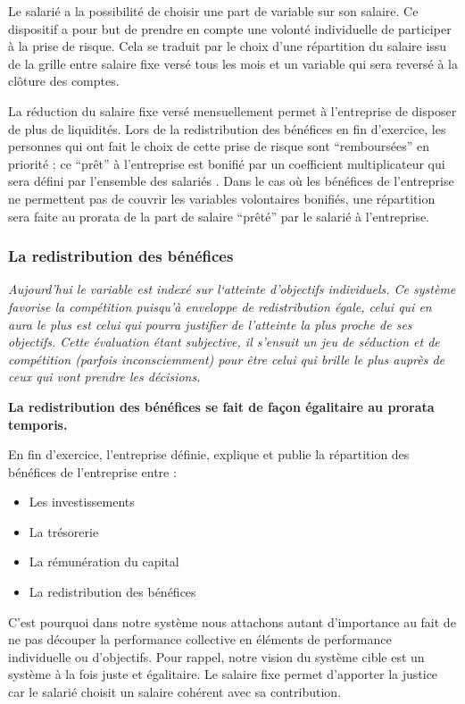 \documentclass[12pt]{article}
\newcommand{\assemblee}[1]{%
  \begin{tcolorbox}[colframe=DarkPlum,boxrule=2pt,arc=4pt,left=6pt,right=6pt,top=6pt,bottom=6pt,boxsep=0pt,colback=white]
    \begin{tabular}{m{1cm} m{0.86\textwidth}}
      {\huge \faUsers} & #1 \\
    \end{tabular}
  \end{tcolorbox}
}
\newcommand{\actuel}[1]{%
  \begin{tcolorbox}[colframe=DarkButter,boxrule=2pt,arc=4pt,left=6pt,right=6pt,top=6pt,bottom=6pt,boxsep=0pt,colback=Aluminium2]
    \textit{#1}
  \end{tcolorbox}
}
\newcommand{\regle}[1]{%
  \begin{tcolorbox}[colframe=DarkOrange,boxrule=2pt,arc=4pt,left=6pt,right=6pt,top=6pt,bottom=6pt,boxsep=0pt,colback=LightOrange]
  \textbf{#1}
  \end{tcolorbox}
}
\begin{document}
 Le salarié a la possibilité de choisir une part de variable sur son salaire. Ce dispositif a pour but de prendre en compte une volonté individuelle de participer à la prise de risque. Cela se traduit par le choix d’une répartition du salaire issu de la grille entre salaire fixe versé tous les mois et un variable qui sera reversé à la clôture des comptes. 
 
 La réduction du salaire fixe versé mensuellement permet à l’entreprise de disposer de plus de liquidités. Lors de la redistribution des bénéfices en fin d’exercice, les personnes qui ont fait le choix de cette prise de risque sont “remboursées” en priorité ; ce “prêt” à l’entreprise est bonifié par un coefficient multiplicateur qui sera défini par l’ensemble des salariés \faUsers. Dans le cas où les bénéfices de l’entreprise ne permettent pas de couvrir les variables volontaires bonifiés, une répartition sera faite au prorata de la part de salaire “prêté” par le salarié à l’entreprise.

\subsubsection{La redistribution des bénéfices}
\actuel{Aujourd’hui le variable est indexé sur l‘atteinte d’objectifs individuels. Ce système favorise la compétition puisqu’à enveloppe de redistribution égale, celui qui en aura le plus est celui qui pourra justifier de l’atteinte la plus proche de ses objectifs. Cette évaluation étant subjective, il s'ensuit un jeu de séduction et de compétition (parfois inconsciemment) pour être celui qui brille le plus auprès de ceux qui vont prendre les décisions.}

\regle{La redistribution des bénéfices se fait de façon égalitaire au prorata temporis.}
 
 En fin d’exercice, l’entreprise définie, explique et publie la répartition des bénéfices de l’entreprise entre :
 \begin{itemize}
   \item Les investissements
   \item La trésorerie
   \item La rémunération du capital
   \item La redistribution des bénéfices
 \end{itemize}

 C’est pourquoi dans notre système nous attachons autant d’importance au fait de ne pas découper la performance collective en éléments de performance individuelle ou d'objectifs. Pour rappel, notre vision du système cible est un système à la fois juste et égalitaire. Le salaire fixe permet d’apporter la justice car le salarié choisit un salaire cohérent avec sa contribution. 
\end{document}
